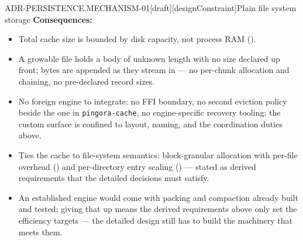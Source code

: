 \begin{requirement}{ADR-PERSISTENCE.MECHANISM-01}[draft][designConstraint]{Plain file system storage}
  \textbf{Consequences:}
  \begin{itemize}
    \item[+] Total cache size is bounded by disk capacity, not process RAM
      ().
    \item[+] A growable file holds a body of unknown length with no size
      declared up front; bytes are appended as they stream in --- no
      per-chunk allocation and chaining, no pre-declared record sizes.
    \item[+] No foreign engine to integrate: no FFI boundary, no second
      eviction policy beside the one in \texttt{pingora-cache}, no engine-specific
      recovery tooling; the custom surface is confined to layout, naming,
      and the coordination duties above.
    \item[--] Ties the cache to file-system semantics: block-granular
      allocation with per-file overhead
      () and per-directory entry
      scaling () --- stated as derived
      requirements that the detailed decisions must satisfy.
    \item[--] An established engine would come with packing and
      compaction already built and tested; giving that up means the
      derived requirements above only set the efficiency targets --- the
      detailed design still has to build the machinery that meets them.
  \end{itemize}




\end{requirement}
